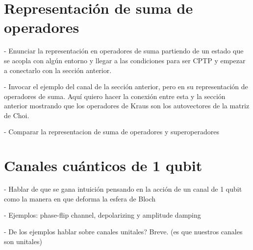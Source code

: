 

\section{Representación de suma de operadores}
- Enunciar la representación en operadores de suma partiendo de un 
estado que se acopla con algún entorno
y llegar a las condiciones para ser CPTP y empezar a conectarlo
con la sección anterior. 

- Invocar el ejemplo del canal de la sección anterior, pero en su 
representación de operadores de suma. Aquí quiero hacer la conexión 
entre esta y la sección anterior mostrando que los operadores 
de Kraus son los autovectores de la matriz de Choi. 

- Comparar la representacion de suma de operadores y superoperadores


\section{Canales cuánticos de 1 qubit}
- Hablar de que se gana intuición pensando en la acción de un canal de 1
qubit como la manera en que deforma la esfera de Bloch

- Ejemplos: phase-flip channel, depolarizing y amplitude damping 

- De los ejemplos hablar sobre canales unitales? Breve. (es que nuestros
canales son unitales)


